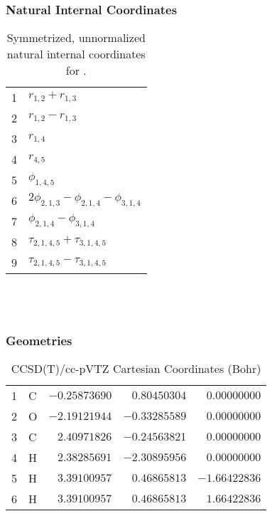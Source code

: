 \documentclass[10pt,oneside]{article}
\begin{document}
\clearpage

\subsubsection*{Natural Internal Coordinates}
\begin{table}[h!]
\centering
\caption{Symmetrized, unnormalized natural internal coordinates for .}
\small
\begin{tabular}{ll}
  1   & $r_{1,2} + r_{1,3}$ \\
  2   & $r_{1,2} - r_{1,3}$ \\
  3   & $r_{1,4}$ \\
  4   & $r_{4,5}$ \\
  5   & $\phi_{1,4,5}$ \\
  6   & $2\phi_{2,1,3} - \phi_{2,1,4} - \phi_{3,1,4}$ \\
  7   & $\phi_{2,1,4} - \phi_{3,1,4}$ \\
  8   & $\tau_{2,1,4,5} + \tau_{3,1,4,5}$ \\
  9   & $\tau_{2,1,4,5} - \tau_{3,1,4,5}$ \\
\end{tabular}
\end{table}

\clearpage

\subsection{\ \ \ }

\subsubsection*{Geometries}
\begin{table}[h!]
\centering
\caption{CCSD(T)/cc-pVTZ Cartesian Coordinates (Bohr)}
\begin{tabular}{llrrr}
1  & C  & $-0.25873690$ & $ 0.80450304$ & $ 0.00000000$ \\
2  & O  & $-2.19121944$ & $-0.33285589$ & $ 0.00000000$ \\
3  & C  & $ 2.40971826$ & $-0.24563821$ & $ 0.00000000$ \\
4  & H  & $ 2.38285691$ & $-2.30895956$ & $ 0.00000000$ \\
5  & H  & $ 3.39100957$ & $ 0.46865813$ & $-1.66422836$ \\
6  & H  & $ 3.39100957$ & $ 0.46865813$ & $ 1.66422836$ \\
\end{tabular}
\end{table}
\end{document}
